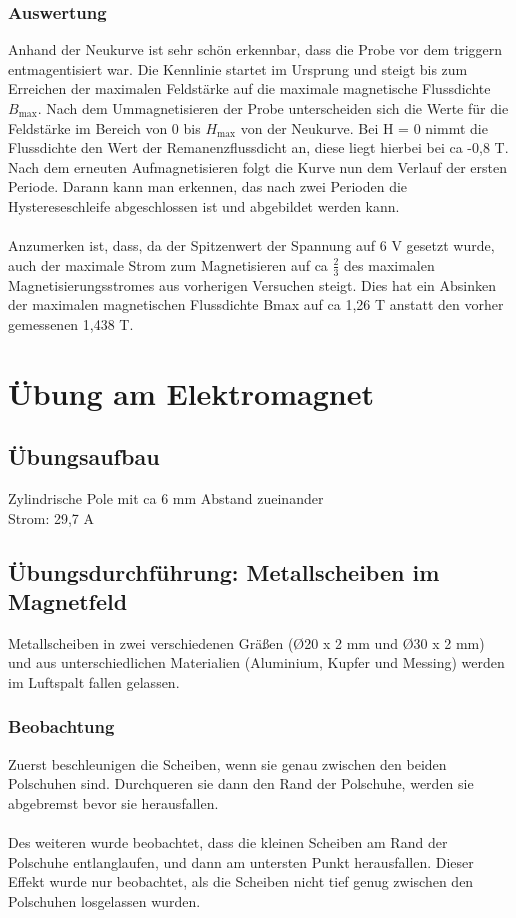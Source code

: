 \documentclass[a4paper,twoside,12pt,DIV=13,BCOR=5mm,numbers=noenddot,cleardoublepage=empty]{scrbook}
\begin{document}
        \subsection{Auswertung}
        Anhand der Neukurve ist sehr sch\"on erkennbar, dass die Probe vor dem triggern entmagentisiert war. Die Kennlinie startet im Ursprung und steigt bis zum Erreichen der maximalen Feldst\"arke auf die maximale magnetische Flussdichte $B_\mathrm{max}$. Nach dem Ummagnetisieren der Probe unterscheiden sich die Werte f\"ur die Feldst\"arke im Bereich von 0 bis $H_\mathrm{max}$ von der Neukurve. Bei H = 0 nimmt die Flussdichte den Wert der Remanenzflussdicht an, diese liegt hierbei bei ca -0,8 T. 
        Nach dem erneuten Aufmagnetisieren folgt die Kurve nun dem Verlauf der ersten Periode. Darann kann man erkennen, das nach zwei Perioden die Hystereseschleife abgeschlossen ist und abgebildet werden kann.
        \\
        \\
        Anzumerken ist, dass, da der Spitzenwert der Spannung auf 6 V gesetzt wurde, auch der maximale Strom zum Magnetisieren auf ca $\frac{2}{3}$ des maximalen Magnetisierungsstromes aus vorherigen Versuchen steigt. Dies hat ein Absinken der maximalen magnetischen Flussdichte Bmax auf ca 1,26 T anstatt den vorher gemessenen 1,438 T.
    \chapter{\"Ubung am Elektromagnet}
    \section{\"Ubungsaufbau}
    Zylindrische Pole mit ca 6 mm Abstand zueinander
    \\
    Strom: 29,7 A
    \section{\"Ubungsdurchf\"uhrung: Metallscheiben im Magnetfeld}
    Metallscheiben in zwei verschiedenen Gr\"a\ss{}en (\O20 x 2 mm und \O30 x 2 mm) und aus unterschiedlichen Materialien (Aluminium, Kupfer und Messing) werden im Luftspalt fallen gelassen.
        \subsection{Beobachtung}
        Zuerst beschleunigen die Scheiben, wenn sie genau zwischen den beiden Polschuhen sind. Durchqueren sie dann den Rand der Polschuhe, werden sie abgebremst bevor sie herausfallen.
        \\
        \\
        Des weiteren wurde beobachtet, dass die kleinen Scheiben am Rand der Polschuhe entlanglaufen, und dann am untersten Punkt herausfallen. Dieser Effekt wurde nur beobachtet, als die Scheiben nicht tief genug zwischen den Polschuhen losgelassen wurden.
\end{document}
